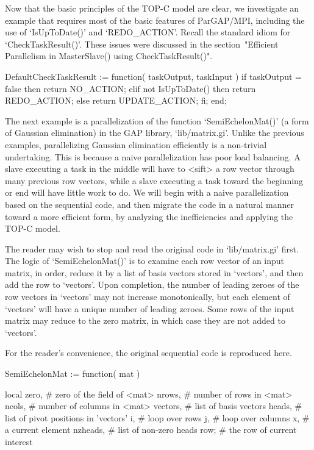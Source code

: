 
Now that the basic principles of the TOP-C model are clear, we
investigate an example that requires most of the basic features of
ParGAP/MPI, including the use of `IsUpToDate()' and
`REDO_ACTION'.  Recall the standard idiom for
`CheckTaskResult()'.  These issues were discussed in
the section~"Efficient Parallelism in MasterSlave() using CheckTaskResult()".

\begintt
DefaultCheckTaskResult := function( taskOutput, taskInput )
  if taskOutput = false then return NO_ACTION;
  elif not IsUpToDate() then return REDO_ACTION;
  else return UPDATE_ACTION;
  fi;
end;
\endtt

The next example is a parallelization of the function
`SemiEchelonMat()' (a form of Gaussian elimination) in the GAP
library, `lib/matrix.gi'.  Unlike the previous examples, parallelizing
Gaussian elimination efficiently is a non-trivial undertaking.  This
is because a naive parallelization has poor load balancing.  A slave
executing a task in the middle will have to <sift> a row vector
through many previous row vectors, while a slave executing a task
toward the beginning or end will have little work to do.  We will
begin with a naive parallelization based on the sequential code, and
then migrate the code in a natural manner toward a more efficient
form, by analyzing the inefficiencies and applying the TOP-C model.

The reader may wish to stop and read the original code in
`lib/matrix.gi' first.  The logic of `SemiEchelonMat()' is to examine
each row vector of an input matrix, in order, reduce it by a list of
basis vectors stored in `vectors', and then add the row to `vectors'.
Upon completion, the number of leading zeroes of the row vectors in
`vectors' may not increase monotonically, but each element of
`vectors' will have a unique number of leading zeroes.  Some rows of
the input matrix may reduce to the zero matrix, in which case they are
not added to `vectors'.

For the reader's convenience, the original sequential code is
reproduced here.

\beginexample
SemiEchelonMat := function( mat )

    local zero,      # zero of the field of <mat>
          nrows,     # number of rows in <mat>
          ncols,     # number of columns in <mat>
          vectors,   # list of basis vectors
          heads,     # list of pivot positions in 'vectors'
          i,         # loop over rows
          j,         # loop over columns
          x,         # a current element
          nzheads,   # list of non-zero heads
          row;       # the row of current interest

